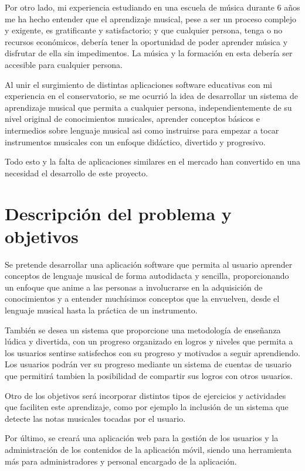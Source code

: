 Por otro lado, mi experiencia estudiando en una escuela de música durante 6 años me ha hecho entender que el aprendizaje musical, pese a ser un proceso complejo y exigente,
es gratificante y satisfactorio; y que cualquier persona, tenga o no recursos económicos, debería tener la oportunidad de poder aprender música y disfrutar de ella sin impedimentos.
La música y la formación en esta debería ser accesible para cualquier persona.

Al unir el surgimiento de distintas aplicaciones software educativas con mi experiencia en el conservatorio, se me ocurrió
la idea de desarrollar un sistema de aprendizaje musical que permita a cualquier persona, independientemente
de su nivel original de conocimientos musicales, aprender conceptos básicos e intermedios sobre lenguaje musical asi como
instruirse para empezar a tocar instrumentos musicales con un enfoque didáctico, divertido y progresivo.

Todo esto y la falta de aplicaciones similares en el mercado han convertido en una necesidad el desarrollo de este proyecto.

\section{Descripción del problema y objetivos}
Se pretende desarrollar una aplicación software que permita al usuario aprender conceptos de lenguaje musical de forma autodidacta y sencilla,
proporcionando un enfoque que anime a las personas a involucrarse en la adquisición de conocimientos y a entender muchísimos conceptos que la envuelven, desde el lenguaje musical
hasta la práctica de un instrumento. 

También se desea un sistema que proporcione una metodología de enseñanza lúdica y divertida, 
con un progreso organizado en logros y niveles que permita a los usuarios sentirse satisfechos con su progreso y motivados a seguir aprendiendo. 
Los usuarios podrán ver su progreso mediante un sistema de cuentas de usuario que permitirá tambien la posibilidad de compartir sus logros con otros usuarios.

Otro de los objetivos será incorporar distintos tipos de ejercicios y actividades que faciliten este aprendizaje, como por ejemplo la inclusión de un sistema que detecte las notas musicales
tocadas por el usuario. 

Por último, se creará una aplicación web para la gestión de los usuarios y la administración de los contenidos de la aplicación móvil, siendo una 
herramienta más para administradores y personal encargado de la aplicación.


